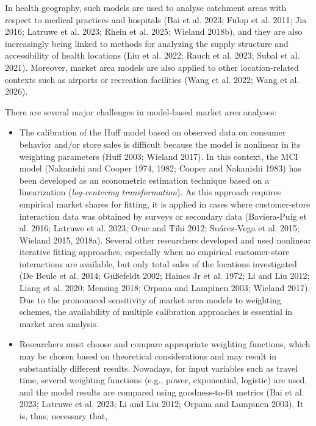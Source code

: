 \documentclass[
]{article}
\begin{document}
In health geography, such models are used to analyse catchment areas
with respect to medical practices and hospitals (Bai et al. 2023; Fülop
et al. 2011; Jia 2016; Latruwe et al. 2023; Rhein et al. 2025; Wieland
2018b), and they are also increasingly being linked to methods for
analyzing the supply structure and accessibility of health locations
(Liu et al. 2022; Rauch et al. 2023; Subal et al. 2021). Moreover,
market area models are also applied to other location-related contexts
such as airports or recreation facilities (Wang et al. 2022; Wang et al.
2026).

There are several major challenges in model-based market area analyses:

\begin{itemize}
\item
  The calibration of the Huff model based on observed data on consumer
  behavior and/or store sales is difficult because the model is
  nonlinear in its weighting parameters (Huff 2003; Wieland 2017). In
  this context, the MCI model (Nakanishi and Cooper 1974, 1982; Cooper
  and Nakanishi 1983) has been developed as an econometric estimation
  technique based on a linearization (\emph{log-centering
  transformation}). As this approach requires empirical market shares
  for fitting, it is applied in cases where customer-store interaction
  data was obtained by surveys or secondary data (Baviera-Puig et al.
  2016; Latruwe et al. 2023; Oruc and Tihi 2012; Suárez-Vega et al.
  2015; Wieland 2015, 2018a). Several other researchers developed and
  used nonlinear iterative fitting approaches, especially when no
  empirical customer-store interactions are available, but only total
  sales of the locations investigated (De Beule et al. 2014; Güßefeldt
  2002; Haines Jr et al. 1972; Li and Liu 2012; Liang et al. 2020;
  Mensing 2018; Orpana and Lampinen 2003; Wieland 2017). Due to the
  pronounced sensitivity of market area models to weighting schemes, the
  availability of multiple calibration approaches is essential in market
  area analysis.
\item
  Researchers must choose and compare appropriate weighting functions,
  which may be chosen based on theoretical considerations and may result
  in substantially different results. Nowadays, for input variables such
  as travel time, several weighting functions (e.g., power, exponential,
  logistic) are used, and the model results are compared using
  goodness-to-fit metrics (Bai et al. 2023; Latruwe et al. 2023; Li and
  Liu 2012; Orpana and Lampinen 2003). It is, thus, necessary that,

\end{itemize}
\end{document}
